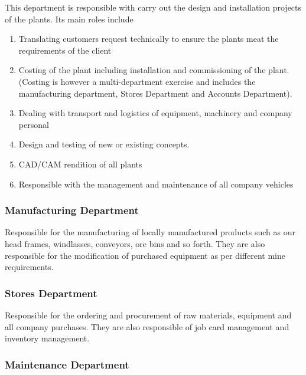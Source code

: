 \noindent This department is responsible with carry out the design and installation projects of the plants. Its main roles include\par

\begin{enumerate}
\item  Translating customers request technically to ensure the plants meat the requirements of the client

\item  Costing of the plant including installation and commissioning of the plant. (Costing is however a multi-department exercise and includes the manufacturing department, Stores Department and Accounts Department).

\item  Dealing with transport and logistics of equipment, machinery and company personal

\item  Design and testing of new or existing concepts. 

\item  CAD/CAM rendition of all plants

\item  Responsible with the management and maintenance of all company vehicles
\end{enumerate}


\subsubsection{  Manufacturing Department}

\noindent Responsible for the manufacturing of locally manufactured products such as our head frames, windlasses, conveyors, ore bins and so forth. They are also responsible for the modification of purchased equipment as per different mine requirements.\par


\subsubsection{ Stores Department}

\noindent Responsible for the ordering and procurement of raw materials, equipment and all company purchases. They are also responsible of job card management and inventory management. \par


\subsubsection{ Maintenance Department}

